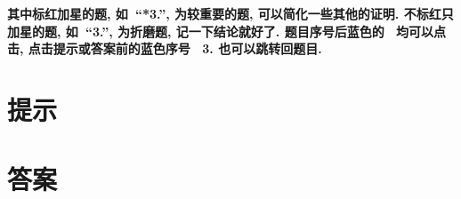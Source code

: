 \documentclass{ctexart}
\begin{document}
{\bfseries 其中标红加星的题, 如\  ``{\bfseries\color{red}*3.}'',  为较重要的题, 可以简化一些其他的证明. 不标红只加星的题, 如\ ``{\bfseries*3.}'', 为折磨题, 记一下结论就好了. 题目序号后蓝色的\ {\color{blue}\mdseries [提示] [答案]} 均可以点击, 点击提示或答案前的蓝色序号\ {\color{blue} 3.} 也可以跳转回题目.}



\section{提示}

\printhint

\section{答案}

\printanswer


\end{document}
